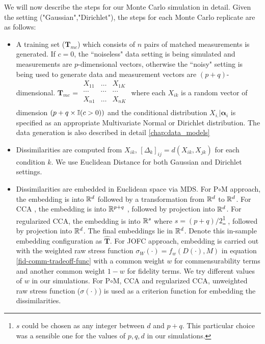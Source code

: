 \documentclass[12pt,oneside,final]{thesis}
\begin{document}
We will now describe the steps for our Monte Carlo simulation in detail. Given the setting ("Gaussian","Dirichlet"),   the steps for each Monte Carlo replicate are as follows:
\begin{itemize}
\item A training set ($\mathbf{T}_{mc}$) which consists of  $n$ pairs of matched measurements is generated.  If $c=0$, the ``noiseless" data setting is being simulated and measurements are $p$-dimensional vectors, otherwise  the ``noisy" setting is being used to generate data and measurement vectors are $(p+q)$-dimensional. $ \mathbf{T}_{mc}$ = 
$\begin{array}{ccc}
        X_{11} & \ldots & X_{1K} \\
        \cdots & \cdots      & \cdots   \\ 
        X_{n1} & \ldots     & X_{nK} \\
    \end{array}
$
 where each $X_{ik}$ is a random vector of dimension $(p+q \times \mathbb{I} (c>0))$ and the conditional distribution  $X_{i.}|\bm{\alpha}_i  $ is specified as an appropriate Multivariate Normal or Dirichlet distribution. The data generation is also described in detail \autoref{chap:data_models}
\item  Dissimilarities are computed from $X_{ik}$, $\left[\Delta_{k}\right]_{ij}=d(X_{ik},X_{jk})$ for each condition $k$. We use Euclidean Distance for both Gaussian and Dirichlet settings.
\item Dissimilarities are embedded in  Euclidean space  via MDS. For P$\circ$M approach, the embedding is into $\mathbb{R}^d$ followed by a transformation from  $\mathbb{R}^d$ to  $\mathbb{R}^d$. For CCA , the embedding is into $\mathbb{R}^{p+q}$ , followed by projection into $\mathbb{R}^d$. For regularized CCA,  the embedding is into $\mathbb{R}^{s}$ where $s=(p+q)/2$\footnote{$s$ could be chosen as any integer between $d$ and $p+q$. This particular choice was a sensible one for the values of $p,q,d$ in our simulations.} , followed by projection into $\mathbb{R}^d$. The final embeddings lie in $\mathbb{R}^d$.   Denote this in-sample embedding configuration as   $\hat{\mathbf{T}}$. For JOFC approach, embedding is carried out with the weighted raw stress function $\sigma_{W}(\cdot)=f_{w}(D(\cdot),M)$ in equation \eqref{fid-comm-tradeoff-func} with a common weight $w$ for commensurability terms and another common weight $1-w$ for fidelity terms. We try different values of $w$ in our simulations. For P$\circ$M, CCA and regularized CCA, unweighted raw stress function ($\sigma(\cdot)$) is used as a criterion function for embedding the dissimilarities.


\end{itemize}
\end{document}
